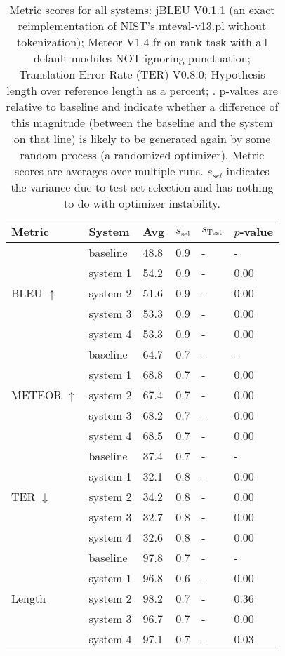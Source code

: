 \begin{table}[htb]
\begin{center}
\begin{footnotesize}
\begin{tabular}{|l|l|l|l|l|l|}
\hline
\bf Metric & \bf System & \bf Avg & \bf $\overline{s}_{\text{sel}}$ & \bf $s_{\text{Test}}$ & \bf $p$-value \\
\hline
\multirow{5}{*}{BLEU $\uparrow$}
& baseline & 48.8 & 0.9 & - & - \\
& system 1 & 54.2 & 0.9 & - & 0.00 \\
& system 2 & 51.6 & 0.9 & - & 0.00 \\
& system 3 & 53.3 & 0.9 & - & 0.00 \\
& system 4 & 53.3 & 0.9 & - & 0.00 \\
\hline
\multirow{5}{*}{METEOR $\uparrow$}
& baseline & 64.7 & 0.7 & - & - \\
& system 1 & 68.8 & 0.7 & - & 0.00 \\
& system 2 & 67.4 & 0.7 & - & 0.00 \\
& system 3 & 68.2 & 0.7 & - & 0.00 \\
& system 4 & 68.5 & 0.7 & - & 0.00 \\
\hline
\multirow{5}{*}{TER $\downarrow$}
& baseline & 37.4 & 0.7 & - & - \\
& system 1 & 32.1 & 0.8 & - & 0.00 \\
& system 2 & 34.2 & 0.8 & - & 0.00 \\
& system 3 & 32.7 & 0.8 & - & 0.00 \\
& system 4 & 32.6 & 0.8 & - & 0.00 \\
\hline
\multirow{5}{*}{Length }
& baseline & 97.8 & 0.7 & - & - \\
& system 1 & 96.8 & 0.6 & - & 0.00 \\
& system 2 & 98.2 & 0.7 & - & 0.36 \\
& system 3 & 96.7 & 0.7 & - & 0.00 \\
& system 4 & 97.1 & 0.7 & - & 0.03 \\
\hline
\end{tabular}
\end{footnotesize}
\end{center}
\caption{\label{tab:scores} Metric scores for all systems: jBLEU V0.1.1 (an exact reimplementation of NIST's mteval-v13.pl without tokenization); Meteor V1.4 fr on rank task with all default modules NOT ignoring punctuation; Translation Error Rate (TER) V0.8.0; Hypothesis length over reference length as a percent; . p-values are relative to baseline and indicate whether a difference of this magnitude (between the baseline and the system on that line) is likely to be generated again by some random process (a randomized optimizer). Metric scores are averages over multiple runs. $s_{sel}$ indicates the variance due to test set selection and has nothing to do with optimizer instability.}
\end{table}

